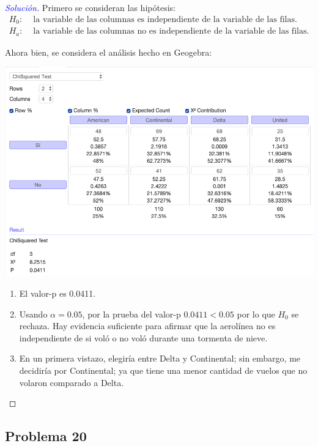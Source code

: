 \documentclass[a4paper,12pt]{article}
\newenvironment{solution}
  {\renewcommand\qedsymbol{$\square$}\begin{proof}[\textcolor{blue}{Solución}]}
  {\end{proof}}
\begin{document}
\begin{solution} 

Primero se consideran las hipótesis: 
\begin{align*}
    H_0: & \text{ la variable de las columnas es independiente de la variable de las filas.}\\ 
    H_a: & \text{  la variable de las columnas no es independiente de la variable de las filas.}
\end{align*}

Ahora bien, se considera el análisis hecho en Geogebra: 
\begin{center}
    \includegraphics[scale=0.45]{images/Screen Shot 2021-05-11 at 00.13.22.png}
\end{center}
\begin{enumerate}
    \item El valor-p es 0.0411.
    \item Usando $\alpha=0.05$, por la prueba del valor-p $0.0411<0.05$ por lo que $H_0$ se rechaza. Hay evidencia suficiente para afirmar que la aerolínea no es independiente de si voló o no voló durante una tormenta de nieve. 
    \item En un primera vistazo, elegiría entre Delta y Continental; sin embargo, me decidiría por Continental; ya que tiene una menor cantidad de vuelos que no volaron comparado a Delta. 
\end{enumerate}
\end{solution}



\subsection{Problema 20} 
\end{document}
